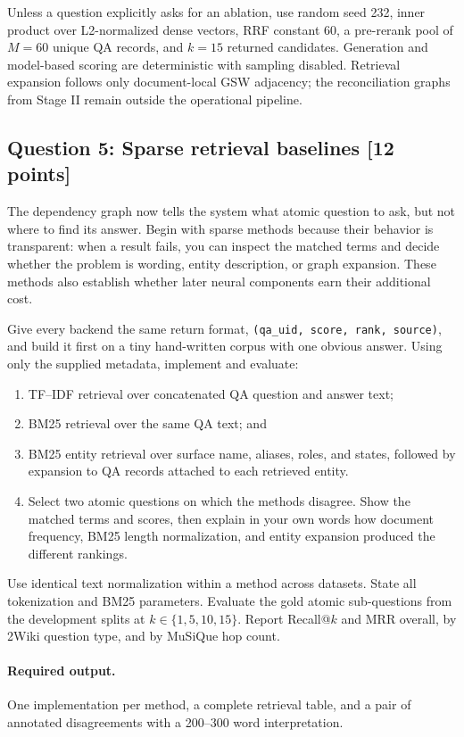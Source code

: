 \documentclass[11pt]{article}
\newcommand{\code}[1]{\texttt{#1}}
\newcommand{\question}[3]{%
  \subsection[Question #1: #2 (#3 points)]{Question #1: #2 \hfill [#3 points]}%
}
\newcommand{\deliverables}{\paragraph{Required output.}}
\begin{document}
Unless a question explicitly asks for an ablation, use random seed 232,
inner product over L2-normalized dense vectors, RRF constant 60, a pre-rerank
pool of $M=60$ unique QA records, and $k=15$ returned candidates. Generation
and model-based scoring are deterministic with sampling disabled. Retrieval
expansion follows only document-local GSW adjacency; the reconciliation graphs
from Stage II remain outside the operational pipeline.

\question{5}{Sparse retrieval baselines}{12}

The dependency graph now tells the system what atomic question to ask, but not
where to find its answer. Begin with sparse methods because their behavior is
transparent: when a result fails, you can inspect the matched terms and decide
whether the problem is wording, entity description, or graph expansion. These
methods also establish whether later neural components earn their additional
cost.

Give every backend the same return format,
\code{(qa\_uid, score, rank, source)}, and build it first on a tiny hand-written
corpus with one obvious answer. Using only the supplied metadata, implement
and evaluate:

\begin{enumerate}[label=(\alph*)]
  \item TF--IDF retrieval over concatenated QA question and answer text;
  \item BM25 retrieval over the same QA text; and
  \item BM25 entity retrieval over surface name, aliases, roles, and states,
        followed by expansion to QA records attached to each retrieved entity.
  \item Select two atomic questions on which the methods disagree. Show the
        matched terms and scores, then explain in your own words how document
        frequency, BM25 length normalization, and entity expansion produced
        the different rankings.
\end{enumerate}

Use identical text normalization within a method across datasets. State all
tokenization and BM25 parameters. Evaluate the gold atomic sub-questions from
the development splits at $k\in\{1,5,10,15\}$. Report Recall@$k$ and MRR
overall, by 2Wiki question type, and by MuSiQue hop count.

\deliverables One implementation per method, a complete retrieval table, and
a pair of annotated disagreements with a 200--300 word interpretation.
\end{document}
